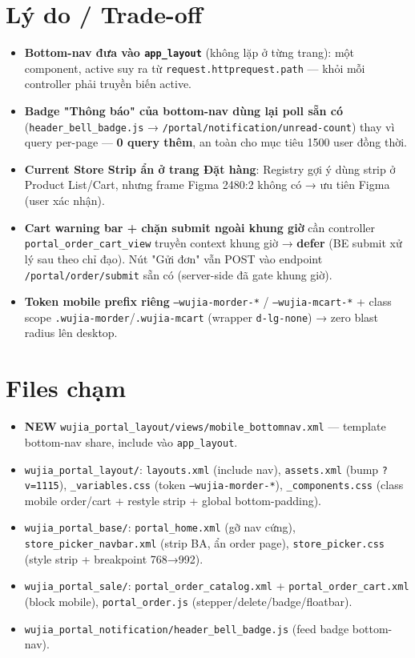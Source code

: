 \section{Lý do / Trade-off}

\begin{itemize}
  \item \textbf{Bottom-nav đưa vào \texttt{app\_layout}} (không lặp ở từng trang):
        một component, active suy ra từ \texttt{request.httprequest.path} ---
        khỏi mỗi controller phải truyền biến active.
  \item \textbf{Badge "Thông báo" của bottom-nav dùng lại poll sẵn có}
        (\texttt{header\_bell\_badge.js} → \texttt{/portal/notification/unread-count})
        thay vì query per-page --- \textbf{0 query thêm}, an toàn cho mục tiêu
        1500 user đồng thời.
  \item \textbf{Current Store Strip ẩn ở trang Đặt hàng}: Registry gợi ý dùng strip
        ở Product List/Cart, nhưng frame Figma 2480:2 không có → ưu tiên Figma
        (user xác nhận).
  \item \textbf{Cart warning bar + chặn submit ngoài khung giờ} cần controller
        \texttt{portal\_order\_cart\_view} truyền context khung giờ → \textbf{defer}
        (BE submit xử lý sau theo chỉ đạo). Nút "Gửi đơn" vẫn POST vào endpoint
        \texttt{/portal/order/submit} sẵn có (server-side đã gate khung giờ).
  \item \textbf{Token mobile prefix riêng} \texttt{--wujia-morder-*} /
        \texttt{--wujia-mcart-*} + class scope \texttt{.wujia-morder}/\texttt{.wujia-mcart}
        (wrapper \texttt{d-lg-none}) → zero blast radius lên desktop.
\end{itemize}

\section{Files chạm}

\begin{itemize}
  \item \textbf{NEW} \texttt{wujia\_portal\_layout/views/mobile\_bottomnav.xml} ---
        template bottom-nav share, include vào \texttt{app\_layout}.
  \item \texttt{wujia\_portal\_layout/}: \texttt{layouts.xml} (include nav),
        \texttt{assets.xml} (bump \texttt{?v=1115}), \texttt{\_variables.css}
        (token \texttt{--wujia-morder-*}), \texttt{\_components.css} (class mobile
        order/cart + restyle strip + global bottom-padding).
  \item \texttt{wujia\_portal\_base/}: \texttt{portal\_home.xml} (gỡ nav cứng),
        \texttt{store\_picker\_navbar.xml} (strip BA, ẩn order page),
        \texttt{store\_picker.css} (style strip + breakpoint 768→992).
  \item \texttt{wujia\_portal\_sale/}: \texttt{portal\_order\_catalog.xml} +
        \texttt{portal\_order\_cart.xml} (block mobile), \texttt{portal\_order.js}
        (stepper/delete/badge/floatbar).
  \item \texttt{wujia\_portal\_notification/header\_bell\_badge.js} (feed badge
        bottom-nav).
\end{itemize}

